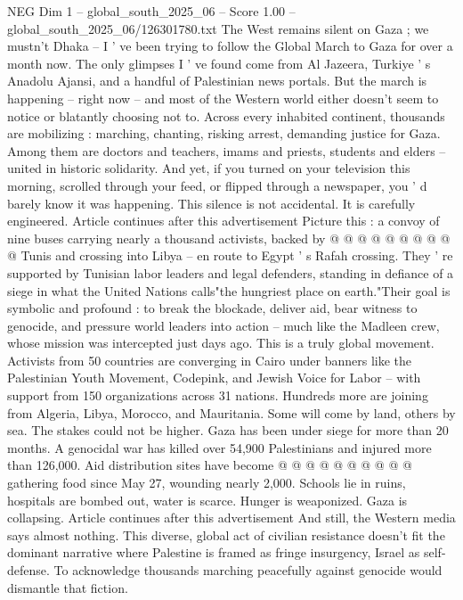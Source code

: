 \begin{textsample}{NEG Dim 1 – global\_south\_2025\_06 – Score 1.00 – global\_south\_2025\_06/126301780.txt}  \label{ex:f1_neg_239}
The West remains silent on Gaza ; we mustn't Dhaka -- I ' ve been trying to follow the Global March to Gaza for over a month now.
The only glimpses I ' ve found come from Al Jazeera, Turkiye ' s Anadolu Ajansi, and a handful of Palestinian news portals.
But the march is happening -- right now -- and most of the Western world either doesn't seem to notice or blatantly choosing not to.
Across every inhabited continent, thousands are mobilizing : marching, chanting, risking arrest, demanding justice for Gaza.
Among them are doctors and teachers, imams and priests, students and elders -- united in historic solidarity.
And yet, if you turned on your television this morning, scrolled through your feed, or flipped through a newspaper, you ' d barely know it was happening.
This silence is not accidental.
It is carefully engineered.
Article continues after this advertisement Picture this : a convoy of nine buses carrying nearly a thousand activists, backed by @ @ @ @ @ @ @ @ @ @ Tunis and crossing into Libya -- en route to Egypt ' s Rafah crossing.
They ' re supported by Tunisian labor leaders and legal defenders, standing in defiance of a siege in what the United Nations calls"the hungriest place on earth."Their goal is symbolic and profound : to break the blockade, deliver aid, bear witness to genocide, and pressure world leaders into action -- much like the Madleen crew, whose mission was intercepted just days ago.
This is a truly global movement.
Activists from 50 countries are converging in Cairo under banners like the Palestinian Youth Movement, Codepink, and Jewish Voice for Labor -- with support from 150 organizations across 31 nations.
Hundreds more are joining from Algeria, Libya, Morocco, and Mauritania.
Some will come by land, others by sea.
The stakes could not be higher.
Gaza has been under siege for more than 20 months.
A genocidal war has killed over 54,900 Palestinians and injured more than 126,000.
Aid distribution sites have become @ @ @ @ @ @ @ @ @ @ gathering food since May 27, wounding nearly 2,000.
Schools lie in ruins, hospitals are bombed out, water is scarce.
Hunger is weaponized.
Gaza is collapsing.
Article continues after this advertisement And still, the Western media says almost nothing.
This diverse, global act of civilian resistance doesn't fit the dominant narrative where Palestine is framed as fringe insurgency, Israel as self-defense.
To acknowledge thousands marching peacefully against genocide would dismantle that fiction.

\end{textsample}
